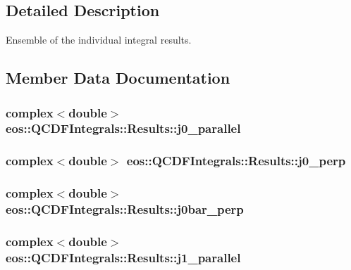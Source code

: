 \subsection{Detailed Description}
Ensemble of the individual integral results. 

\subsection{Member Data Documentation}
\hypertarget{structeos_1_1QCDFIntegrals_1_1Results_a3f70a602dc4afa4c37edff48032487c5}{
\subsubsection[{j0\_\-parallel}]{\setlength{\rightskip}{0pt plus 5cm}complex$<$double$>$ {\bf eos::QCDFIntegrals::Results::j0\_\-parallel}}}
\label{structeos_1_1QCDFIntegrals_1_1Results_a3f70a602dc4afa4c37edff48032487c5}
\hypertarget{structeos_1_1QCDFIntegrals_1_1Results_a0a54f336f6b2c1c872ca0960019364e0}{
\subsubsection[{j0\_\-perp}]{\setlength{\rightskip}{0pt plus 5cm}complex$<$double$>$ {\bf eos::QCDFIntegrals::Results::j0\_\-perp}}}
\label{structeos_1_1QCDFIntegrals_1_1Results_a0a54f336f6b2c1c872ca0960019364e0}
\hypertarget{structeos_1_1QCDFIntegrals_1_1Results_a955c86eea4fcade3cb1c933bc37f045f}{
\subsubsection[{j0bar\_\-perp}]{\setlength{\rightskip}{0pt plus 5cm}complex$<$double$>$ {\bf eos::QCDFIntegrals::Results::j0bar\_\-perp}}}
\label{structeos_1_1QCDFIntegrals_1_1Results_a955c86eea4fcade3cb1c933bc37f045f}
\hypertarget{structeos_1_1QCDFIntegrals_1_1Results_a0f526f7579916a3a6d0ae2b8262a785c}{
\subsubsection[{j1\_\-parallel}]{\setlength{\rightskip}{0pt plus 5cm}complex$<$double$>$ {\bf eos::QCDFIntegrals::Results::j1\_\-parallel}}}
